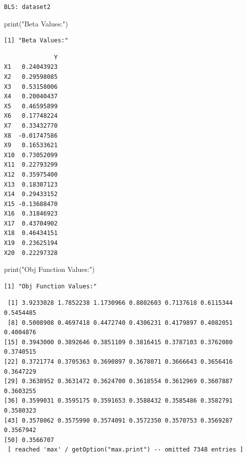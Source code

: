 \documentclass[
  letterpaper,
  DIV=11,
  numbers=noendperiod]{scrartcl}
\newenvironment{Shaded}{\begin{snugshade}}{\end{snugshade}}
\newcommand{\FunctionTok}[1]{\textcolor[rgb]{0.28,0.35,0.67}{#1}}
\newcommand{\NormalTok}[1]{\textcolor[rgb]{0.00,0.23,0.31}{#1}}
\newcommand{\SpecialCharTok}[1]{\textcolor[rgb]{0.37,0.37,0.37}{#1}}
\newcommand{\StringTok}[1]{\textcolor[rgb]{0.13,0.47,0.30}{#1}}
\begin{document}
\begin{verbatim}
BLS: dataset2 
\end{verbatim}

\begin{Shaded}
\begin{Highlighting}[]
\FunctionTok{print}\NormalTok{(}\StringTok{"Beta Values:"}\NormalTok{)}
\end{Highlighting}
\end{Shaded}

\begin{verbatim}
[1] "Beta Values:"
\end{verbatim}

\begin{Shaded}
\end{Shaded}

\begin{verbatim}
              Y
X1   0.24043923
X2   0.29598085
X3   0.53158006
X4   0.20040437
X5   0.46595899
X6   0.17748224
X7   0.33432770
X8  -0.01747586
X9   0.16533621
X10  0.73052099
X11  0.22793299
X12  0.35975400
X13  0.18307123
X14  0.29433152
X15 -0.13688470
X16  0.31846923
X17  0.43704902
X18  0.46434151
X19  0.23625194
X20  0.22297328
\end{verbatim}

\begin{Shaded}
\begin{Highlighting}[]
\FunctionTok{print}\NormalTok{(}\StringTok{"Obj Function Values:"}\NormalTok{)}
\end{Highlighting}
\end{Shaded}

\begin{verbatim}
[1] "Obj Function Values:"
\end{verbatim}

\begin{Shaded}
\end{Shaded}

\begin{verbatim}
 [1] 3.9233028 1.7852238 1.1730966 0.8802603 0.7137618 0.6115344 0.5454485
 [8] 0.5008908 0.4697418 0.4472740 0.4306231 0.4179897 0.4082051 0.4004876
[15] 0.3943000 0.3892646 0.3851109 0.3816415 0.3787103 0.3762080 0.3740515
[22] 0.3721774 0.3705363 0.3690897 0.3678071 0.3666643 0.3656416 0.3647229
[29] 0.3638952 0.3631472 0.3624700 0.3618554 0.3612969 0.3607887 0.3603255
[36] 0.3599031 0.3595175 0.3591653 0.3588432 0.3585486 0.3582791 0.3580323
[43] 0.3578062 0.3575990 0.3574091 0.3572350 0.3570753 0.3569287 0.3567942
[50] 0.3566707
 [ reached 'max' / getOption("max.print") -- omitted 7348 entries ]
\end{verbatim}
\end{document}
